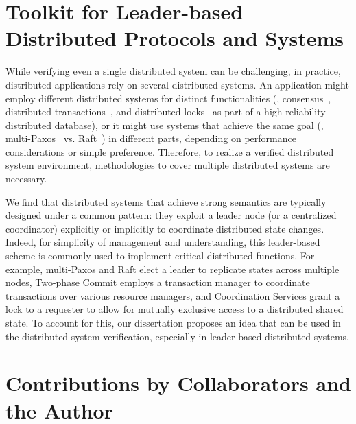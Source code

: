 \section{Toolkit for Leader-based Distributed Protocols and Systems}
\label{chapter:introduction:sec:toolkit-for-leader-based-distributed-protocols-and-systems}


While verifying even a single distributed system can be challenging, in practice, distributed applications rely on several distributed systems. 
An application might employ different distributed systems for distinct functionalities (\eg, consensus~\cite{vivaladifference}, 
distributed transactions~\cite{gray:2006}, and distributed locks~\cite{chubby, zookeeper}  as part of a high-reliability distributed database), 
or it might use systems that achieve the same goal (\eg, multi-Paxos~\cite{paxosmadesimple, rvrpaxos} vs. Raft~\cite{raft}) in different parts, 
depending on performance considerations or simple preference. 
Therefore, to realize a verified distributed system environment, methodologies to cover multiple distributed systems are necessary. 


We find that distributed systems that achieve strong semantics are typically designed under a common pattern: 
they exploit a leader node (or a centralized coordinator) explicitly or implicitly to coordinate distributed state changes. 
Indeed, for simplicity of management and understanding, this leader-based scheme is commonly used to implement critical distributed functions. 
For example, multi-Paxos and Raft elect a leader to replicate states across multiple nodes, 
Two-phase Commit employs a transaction manager to coordinate transactions over various resource managers, 
and Coordination Services grant a lock to a requester to allow for mutually exclusive access to a distributed shared state. 
To account for this, our dissertation proposes an idea that can be used in the distributed system verification, especially in leader-based distributed systems. 

\section{Contributions by Collaborators and the Author}
\label{chapter:introduction:sec:contributions-by-collaborators}

